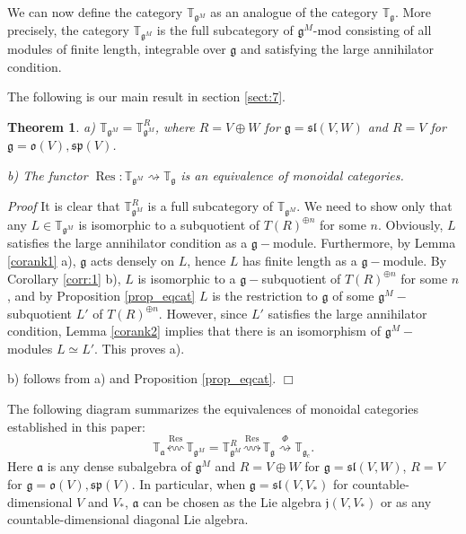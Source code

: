 \documentclass{svmult}
\newtheorem{theo}{Theorem}[section]
\renewenvironment{proof}{ \emph{Proof}}{$\Box$}
\newcommand{\TT}{\mathbb{T}}
\newcommand{\jj}{\mathfrak{j}}
\renewcommand{\sp}{\mathfrak{sp}}
\renewcommand{\sl}{\mathfrak{sl}}
\newcommand{\oo}{\mathfrak{o}}
\renewcommand{\aa}{\mathfrak{a}}
\renewcommand{\gg}{\mathfrak{g}}
\begin{document}

\vspace{0.33cm}

We can now define the category $\TT_{\gg^M}$ as an analogue of the category $\TT_\gg$. More precisely, the category $\TT_{\gg^M}$ is the full subcategory of $\gg^M$-mod consisting of all modules of finite length, 
integrable over $\gg$ and satisfying the large annihilator condition.

The following is our main result in section \ref{sect:7}.
\begin{theo}\label{mainres_sect7}
 a) $\TT_{\gg^M} = \TT_{\gg^M}^R$, where $R = V\oplus W$ for $\gg = \sl(V,W)$ and $R=V$ for $\gg = \oo(V), \sp(V)$.
 
 b) The functor $\operatorname{Res}:\TT_{\gg^M} \rightsquigarrow \TT_\gg$ is an equivalence of monoidal categories.
\end{theo}
\begin{proof}
 It is clear that $\TT_{\gg^M}^R$ is a full subcategory of $\TT_{\gg^M}$. We need to show only that any $L \in \TT_{\gg^M}$ is isomorphic to a subquotient of $T(R)^{\oplus n}$ for some $n$. Obviously, $L$ satisfies the large annihilator condition as a $\gg-$module. Furthermore, by Lemma \ref{corank1} a), $\gg$ acts densely on $L$, hence $L$ has finite length as a $\gg-$module. By Corollary \ref{corr:1} b), $L$ is isomorphic to a $\gg-$subquotient of $T(R)^{\oplus n}$ for some $n$, and by Proposition \ref{prop_eqcat} $L$ is the restriction to $\gg$ of some $\gg^M-$subquotient $L'$ of $T(R)^{\oplus n}$. However, since $L'$ satisfies the large annihilator condition, Lemma \ref{corank2} implies that there is an isomorphism of $\gg^M-$modules $L\simeq L'$. This proves a).
 
 b) follows from a) and Proposition \ref{prop_eqcat}.
\end{proof}

\vspace{0.33cm}

The following diagram summarizes the equivalences of monoidal categories established in this paper:
$$ \TT_{\aa} \stackrel{\operatorname{Res}}{\leftsquigarrow} \TT_{\gg^M} = \TT_{\gg^M}^R \stackrel {\operatorname{Res}}{\rightsquigarrow} \TT_{\gg} \stackrel{\Phi}{\rightsquigarrow} \TT_{\gg_c}.$$
Here $\aa$ is any dense subalgebra of $\gg^M$ and $R = V\oplus W$ for $\gg = \sl(V,W)$, $R=V$ for $\gg = \oo(V), \sp(V)$. In particular, when $\gg = \sl(V,V_*)$ for countable-dimensional $V$ and $V_*$, $\aa$ can be chosen as the Lie algebra $\jj(V,V_*)$ or as any countable-dimensional diagonal Lie algebra.
\end{document}
